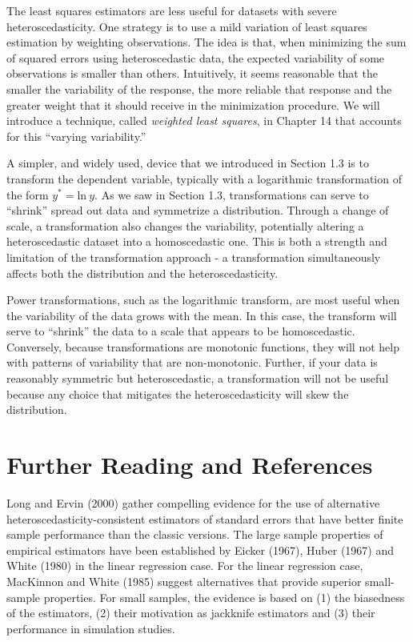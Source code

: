 The least squares estimators are less useful for datasets with
severe heteroscedasticity. One strategy is to use a mild variation
of least squares estimation by weighting observations. The idea is
that, when minimizing the sum of squared errors using
heteroscedastic data, the expected variability of some observations
is smaller than others. Intuitively, it seems reasonable that the
smaller the variability of the response, the more reliable that
response and the greater weight that it should receive in the
minimization procedure. We will introduce a technique, called
\textit{weighted least squares}, in Chapter 14 that accounts for
this ``varying variability.''

A simpler, and widely used, device that we introduced in Section 1.3
is to transform the dependent variable, typically with a logarithmic
transformation of the form $y^{\ast} = \mathrm{ln~}y$. As we saw in
Section 1.3, transformations can serve to ``shrink'' spread out data
and symmetrize a distribution. Through a change of scale, a
transformation also changes the variability, potentially altering a
heteroscedastic dataset into a homoscedastic one. This is both a
strength and limitation of the transformation approach - a
transformation simultaneously affects both the distribution and the
heteroscedasticity.


Power transformations, such as the logarithmic transform, are most
useful when the variability of the data grows with the mean. In this
case, the transform will serve to ``shrink'' the data to a scale
that appears to be homoscedastic. Conversely, because
transformations are monotonic functions, they will not help with
patterns of variability that are non-monotonic. Further, if your
data is reasonably symmetric but heteroscedastic, a transformation
will not be useful because any choice that mitigates the
heteroscedasticity will skew the distribution.



\section{Further Reading and References}

Long and Ervin (2000) gather compelling evidence for the use of
alternative \newline heteroscedasticity-consistent estimators of
standard errors that have better finite sample performance than the
classic versions. The large sample properties of empirical
estimators have been established by Eicker (1967), Huber (1967) and
White (1980) in the linear regression case. For the linear
regression case, MacKinnon and White (1985) suggest alternatives
that provide superior small-sample properties. For small samples,
the evidence is based on (1) the biasedness of the estimators, (2)
their motivation as jackknife estimators and (3) their performance
in simulation studies.

